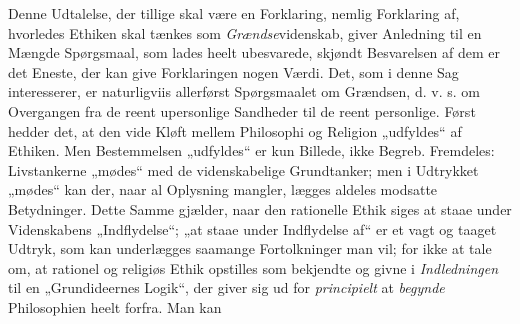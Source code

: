 \documentclass[12pt,a4paper]{book}
\newcommand{\opage}[1]{\marginnote{\footnotesize\textit{[#1]}}}
\begin{document}
Denne Udtalelse, der tillige skal være en Forkla\opage{32}\setcounter{footnote}{0}ring,
nemlig Forklaring af, hvorledes Ethiken skal tænkes
som \emph{Grændse}videnskab, giver Anledning til en Mængde
Spørgsmaal, som lades heelt ubesvarede, skjøndt Besvarelsen
af dem er det Eneste, der kan give Forklaringen
nogen Værdi. Det, som i denne Sag interesserer, er
naturligviis allerførst Spørgsmaalet om Grændsen, d. v. s.
om Overgangen fra de reent upersonlige Sandheder til
de reent personlige. Først hedder det, at den vide Kløft
mellem Philosophi og Religion „udfyldes“ af Ethiken.
Men Bestemmelsen „udfyldes“ er kun Billede, ikke Begreb.
Fremdeles: Livstankerne „mødes“ med de videnskabelige
Grundtanker; men i Udtrykket „mødes“ kan der, naar
al Oplysning mangler, lægges aldeles modsatte Betydninger.
Dette Samme gjælder, naar den rationelle Ethik
siges at staae under Videnskabens „Indflydelse“; „at
staae under Indflydelse af“ er et vagt og taaget Udtryk,
som kan underlægges saamange Fortolkninger man vil;
for ikke at tale om, at rationel og religiøs Ethik opstilles
som bekjendte og givne i \emph{Indledningen} til en
„Grundideernes Logik“, der giver sig ud for \emph{principielt}
at \emph{begynde} Philosophien heelt forfra. Man kan
\end{document}
